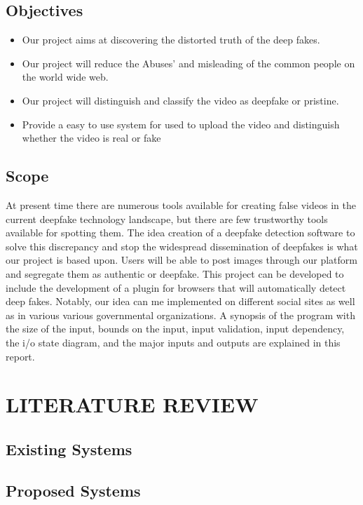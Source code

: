 \documentclass[12 pt]{article}
\begin{document}
\subsection{Objectives}
\justify
\begin{itemize}
    \item Our project aims at discovering the distorted truth of the deep fakes.
    \item Our project will reduce the Abuses’ and misleading of the common people on
          the world wide web.
    \item Our project will distinguish and classify the video as deepfake or pristine.
    \item Provide a easy to use system for used to upload the video and distinguish
          whether the video is real or fake
\end{itemize}
\newpage
\subsection{Scope}
At present time there are numerous tools available for creating false videos in the current deepfake technology landscape, but there are few trustworthy tools available for spotting them. The idea creation of a deepfake detection software to solve this discrepancy and stop the widespread dissemination of deepfakes is what our project is based upon. Users will be able to post images through our platform and segregate them as authentic or deepfake. This project can be developed to include the development of a plugin for browsers that will automatically detect deep fakes. Notably, our idea can me implemented on different social sites as well as in various various governmental organizations. A synopsis of the program with the size of the input, bounds on the input, input validation, input dependency, the i/o state diagram, and the major inputs and outputs are explained in this report.
\newpage
\newpage


\section{LITERATURE REVIEW}
\newpage
\subsection{Existing Systems}
\newpage
\subsection{Proposed Systems}
\newpage
\end{document}
